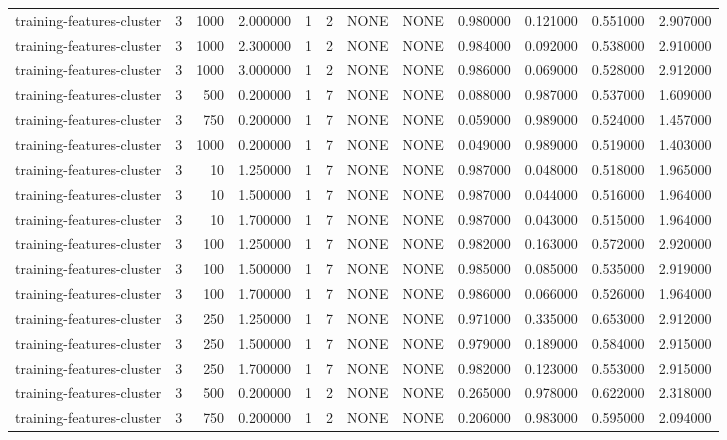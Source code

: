 \begin{tabular}{lrrrllllrrrr}
training-features-cluster & 3 & 1000 & 2.000000 & 1 & 2 & NONE & NONE & 0.980000 & 0.121000 & 0.551000 & 2.907000 \\
training-features-cluster & 3 & 1000 & 2.300000 & 1 & 2 & NONE & NONE & 0.984000 & 0.092000 & 0.538000 & 2.910000 \\
training-features-cluster & 3 & 1000 & 3.000000 & 1 & 2 & NONE & NONE & 0.986000 & 0.069000 & 0.528000 & 2.912000 \\
training-features-cluster & 3 & 500 & 0.200000 & 1 & 7 & NONE & NONE & 0.088000 & 0.987000 & 0.537000 & 1.609000 \\
training-features-cluster & 3 & 750 & 0.200000 & 1 & 7 & NONE & NONE & 0.059000 & 0.989000 & 0.524000 & 1.457000 \\
training-features-cluster & 3 & 1000 & 0.200000 & 1 & 7 & NONE & NONE & 0.049000 & 0.989000 & 0.519000 & 1.403000 \\
training-features-cluster & 3 & 10 & 1.250000 & 1 & 7 & NONE & NONE & 0.987000 & 0.048000 & 0.518000 & 1.965000 \\
training-features-cluster & 3 & 10 & 1.500000 & 1 & 7 & NONE & NONE & 0.987000 & 0.044000 & 0.516000 & 1.964000 \\
training-features-cluster & 3 & 10 & 1.700000 & 1 & 7 & NONE & NONE & 0.987000 & 0.043000 & 0.515000 & 1.964000 \\
training-features-cluster & 3 & 100 & 1.250000 & 1 & 7 & NONE & NONE & 0.982000 & 0.163000 & 0.572000 & 2.920000 \\
training-features-cluster & 3 & 100 & 1.500000 & 1 & 7 & NONE & NONE & 0.985000 & 0.085000 & 0.535000 & 2.919000 \\
training-features-cluster & 3 & 100 & 1.700000 & 1 & 7 & NONE & NONE & 0.986000 & 0.066000 & 0.526000 & 1.964000 \\
training-features-cluster & 3 & 250 & 1.250000 & 1 & 7 & NONE & NONE & 0.971000 & 0.335000 & 0.653000 & 2.912000 \\
training-features-cluster & 3 & 250 & 1.500000 & 1 & 7 & NONE & NONE & 0.979000 & 0.189000 & 0.584000 & 2.915000 \\
training-features-cluster & 3 & 250 & 1.700000 & 1 & 7 & NONE & NONE & 0.982000 & 0.123000 & 0.553000 & 2.915000 \\
training-features-cluster & 3 & 500 & 0.200000 & 1 & 2 & NONE & NONE & 0.265000 & 0.978000 & 0.622000 & 2.318000 \\
training-features-cluster & 3 & 750 & 0.200000 & 1 & 2 & NONE & NONE & 0.206000 & 0.983000 & 0.595000 & 2.094000 \\

\end{tabular}
